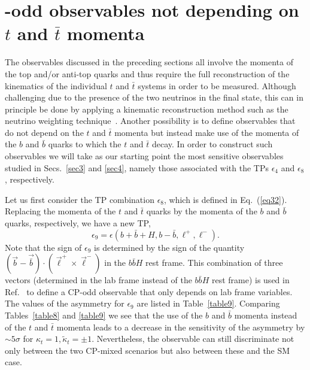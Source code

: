 \documentclass[aps,preprint,tightenlines,floatfix,superscriptaddress,nofootinbib,showpacs]{revtex4-1}
\def\beq{\begin{equation}}
\def\eeq{\end{equation}}
\def\tbar{\bar{t}}
\def\bbar{\bar{b}}
\def\kp{\kappa_t}
\def\kpt{\tilde{\kappa}_t}
\begin{document}
\section{{}-odd observables not depending on \MakeLowercase{{\boldmath $t$}} and \MakeLowercase{{\boldmath $\tbar$}} momenta}
\label{sec5}
The observables discussed in the preceding sections all involve the
momenta of the top and/or anti-top quarks and thus require the full
reconstruction of the kinematics of the individual $t$ and $\tbar$
systems in order to be measured. Although challenging due to the
presence of the two neutrinos in the final state, this can in principle be
done by applying a kinematic reconstruction method such as the
neutrino weighting technique~\cite{atlasconf,atlascharge}. Another
possibility is to define observables that do not depend on the $t$
and $\tbar$ momenta but instead make use of the momenta of the
$b$ and $\bbar$ quarks to which the $t$ and $\tbar$ decay. In
order to construct such observables we will take as our starting
point the most
sensitive observables studied in Secs.~\ref{sec3} and \ref{sec4},
namely those associated with the TPs $\epsilon_4$ and $\epsilon_8$,
respectively.

Let us first consider the TP combination $\epsilon_8$, which is
defined in Eq.~(\ref{eq32}).  Replacing the momenta of the
$t$ and $\tbar$ quarks by the momenta of the $b$ and $\bbar$ quarks,
respectively, we have a new TP,
%
\beq
\label{eq33}
\epsilon_9 = \epsilon(b+\bbar+H,b-\bbar,\ell^+,\ell^-).
\eeq
%
Note that the sign of $\epsilon_9$ is determined by the sign of
the quantity $(\vec{b}-\vec{\bbar})\cdot(\vec{\ell}^+\!\times
\vec{\ell}^-)$ in the $b\bbar H$ rest frame. This combination
of three vectors (determined in the lab frame instead
of the $b\bbar H$ rest frame) is
used in Ref.~\cite{Guadagnoli} to define a
$\mathrm{CP}$-odd observable that only depends on lab frame
variables. The values of the asymmetry for $\epsilon_9$ are listed in
Table~\ref{table9}. Comparing Tables~\ref{table8} and \ref{table9}
we see that the use of the $b$ and $\bbar$ momenta
instead of the $t$ and $\tbar$ momenta leads to a
decrease in the sensitivity of the asymmetry by $\sim 5\sigma$ for
$\kp=1,\kpt=\pm 1$. Nevertheless, the observable can still
discriminate not only between the two $\mathrm{CP}$-mixed scenarios
but also between these and the SM case.
\end{document}
